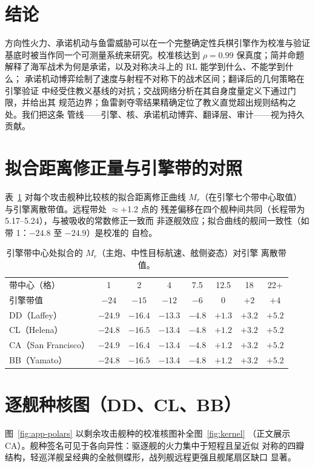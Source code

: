\documentclass[12pt,a4paper]{ctexart}
\begin{document}
\section{结论}
方向性火力、承诺机动与鱼雷威胁可以在一个完整确定性兵棋引擎作为校准与验证
基底时被当作同一个可测量系统来研究。校准核达到 $\rho=0.99$ 保真度；简并命题
解释了海军战术为何是承诺，以及对称决斗上的 RL 能学到什么、不能学到什么；
承诺机动博弈绘制了速度与射程不对称下的战术区间；翻译后的几何策略在引擎验证
中经受住教义基线的对抗；交战网络分析在其自身度量定义下通过门限，并给出其
规范边界；鱼雷剥夺零结果精确定位了教义直觉超出规则结构之处。我们把这条
管线——引擎、核、承诺机动博弈、翻译层、审计——视为持久贡献。

\appendix
\section{拟合距离修正量与引擎带的对照}
\label{app:modifiers}
表~\ref{tab:appendix-modifiers} 对每个攻击舰种比较核的拟合距离修正曲线
$M_r$（在引擎七个带中心取值）与引擎离散带值。远程带处 $\approx$+1.2 点的
残差偏移在四个舰种间共同（长程带为 5.17--5.24），与被吸收的常数修正一致而
非逐舰效应；拟合曲线的舰间一致性（如带 1：$-24.8$ 至 $-24.9$）是校准的
自检。

\begin{table}[h]
\centering\small
\caption{引擎带中心处拟合的 $M_r$（主炮、中性目标航速、舷侧姿态）对引擎
离散带值。}
\label{tab:appendix-modifiers}
\begin{tabular}{lccccccc}
\toprule
带中心（格） & 1 & 2 & 4 & 7.5 & 12.5 & 18 & 22+ \\
引擎带值 & $-24$ & $-15$ & $-12$ & $-6$ & $0$ & $+2$ & $+4$ \\
\midrule
DD（Laffey） & $-24.9$ & $-16.4$ & $-13.3$ & $-4.8$ & $+1.3$ & $+3.2$ & $+5.2$ \\
CL（Helena） & $-24.8$ & $-16.5$ & $-13.4$ & $-4.8$ & $+1.2$ & $+3.2$ & $+5.2$ \\
CA（San Francisco） & $-24.9$ & $-16.4$ & $-13.4$ & $-4.8$ & $+1.2$ & $+3.2$ & $+5.2$ \\
BB（Yamato） & $-24.8$ & $-16.5$ & $-13.4$ & $-4.8$ & $+1.2$ & $+3.2$ & $+5.2$ \\
\bottomrule
\end{tabular}
\end{table}

\section{逐舰种核图（DD、CL、BB）}
\label{app:polars}
图~\ref{fig:app-polars} 以剩余攻击舰种的校准核图补全图~\ref{fig:kernel}
（正文展示 CA）。舰种签名可见于各向异性：驱逐舰的火力集中于短程且呈近似
对称的四瓣结构，轻巡洋舰呈经典的全舷侧蝶形，战列舰远程更强且舰尾扇区缺口
显著。
\end{document}
